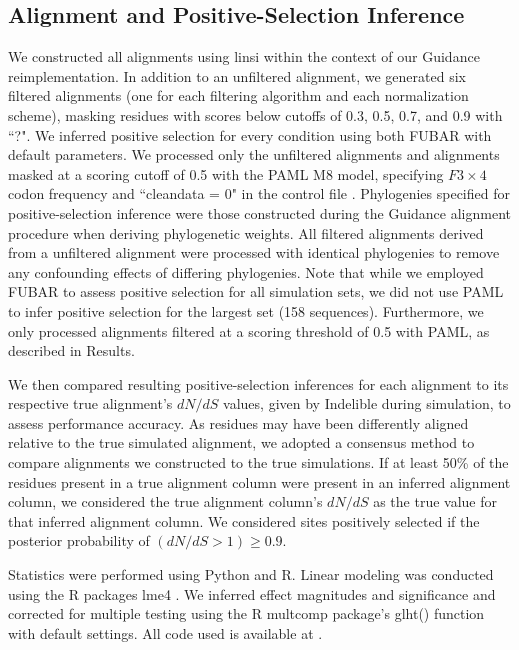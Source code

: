 \documentclass[10pt]{article}
\begin{document}
\subsection*{Alignment and Positive-Selection Inference}
We constructed all alignments using linsi \citep{Katoh2002,Katoh2005} within the context of our Guidance reimplementation. In addition to an unfiltered alignment, we generated six filtered alignments (one for each filtering algorithm and each normalization scheme), masking residues with scores below cutoffs of 0.3, 0.5, 0.7, and 0.9 with ``?". We inferred positive selection for every condition using both FUBAR \citep{Murrell2013} with default parameters. We processed only the unfiltered alignments and alignments masked at a scoring cutoff of 0.5 with the PAML M8 model, specifying $F3\times4$ codon frequency and ``cleandata = 0" in the control file \citep{Yang2007}. Phylogenies specified for positive-selection inference were those constructed during the Guidance alignment procedure when deriving phylogenetic weights. All filtered alignments derived from a unfiltered alignment were processed with identical phylogenies to remove any confounding effects of differing phylogenies. Note that while we employed FUBAR to assess positive selection for all simulation sets, we did not use PAML to infer positive selection for the largest set (158 sequences). Furthermore, we only processed alignments filtered at a scoring threshold of 0.5 with PAML, as described in Results.

We then compared resulting positive-selection inferences for each alignment to its respective true alignment's $dN/dS$ values, given by Indelible during simulation, to assess performance accuracy. As residues may have been differently aligned relative to the true simulated alignment, we adopted a consensus method to compare alignments we constructed to the true simulations. If at least 50\% of the residues present in a true alignment column were present in an inferred alignment column, we considered the true alignment column's $dN/dS$ as the true value for that inferred alignment column. We considered sites positively selected if the posterior probability of $(dN/dS>1) \geq 0.9$.

Statistics were performed using Python and R. Linear modeling was conducted using the R packages lme4 \citep{Bates2012}. We inferred effect magnitudes and significance and corrected for multiple testing using the R multcomp package's glht() function \citep{Hothorn2008} with default settings. All code used is available at .
\end{document}
